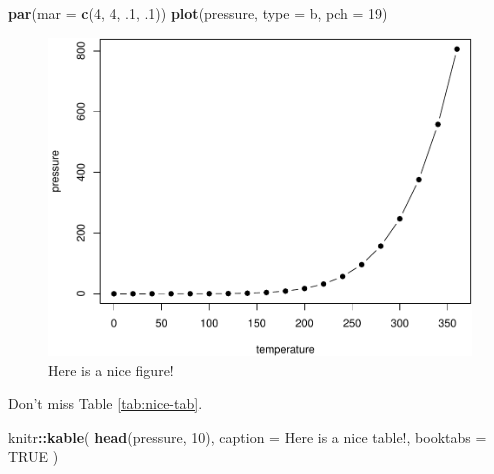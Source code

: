 \documentclass[
]{book}
\newenvironment{Shaded}{\begin{snugshade}}{\end{snugshade}}
\newcommand{\AttributeTok}[1]{\textcolor[rgb]{0.13,0.29,0.53}{#1}}
\newcommand{\ConstantTok}[1]{\textcolor[rgb]{0.56,0.35,0.01}{#1}}
\newcommand{\DecValTok}[1]{\textcolor[rgb]{0.00,0.00,0.81}{#1}}
\newcommand{\FunctionTok}[1]{\textcolor[rgb]{0.13,0.29,0.53}{\textbf{#1}}}
\newcommand{\NormalTok}[1]{#1}
\newcommand{\SpecialCharTok}[1]{\textcolor[rgb]{0.81,0.36,0.00}{\textbf{#1}}}
\newcommand{\StringTok}[1]{\textcolor[rgb]{0.31,0.60,0.02}{#1}}
\theoremstyle{definition}
\theoremstyle{definition}
\theoremstyle{definition}
\theoremstyle{definition}
\theoremstyle{remark}
\begin{document}
\begin{Shaded}
\begin{Highlighting}[]
\FunctionTok{par}\NormalTok{(}\AttributeTok{mar =} \FunctionTok{c}\NormalTok{(}\DecValTok{4}\NormalTok{, }\DecValTok{4}\NormalTok{, .}\DecValTok{1}\NormalTok{, .}\DecValTok{1}\NormalTok{))}
\FunctionTok{plot}\NormalTok{(pressure, }\AttributeTok{type =} \StringTok{\textquotesingle{}b\textquotesingle{}}\NormalTok{, }\AttributeTok{pch =} \DecValTok{19}\NormalTok{)}
\end{Highlighting}
\end{Shaded}

\begin{figure}

{\centering \includegraphics[width=0.8\linewidth]{202401280000-minimal-book-example_files/figure-latex/nice-fig-1} 

}

\caption{Here is a nice figure!}\label{fig:nice-fig}
\end{figure}

Don't miss Table \ref{tab:nice-tab}.

\begin{Shaded}
\begin{Highlighting}[]
\NormalTok{knitr}\SpecialCharTok{::}\FunctionTok{kable}\NormalTok{(}
  \FunctionTok{head}\NormalTok{(pressure, }\DecValTok{10}\NormalTok{), }\AttributeTok{caption =} \StringTok{\textquotesingle{}Here is a nice table!\textquotesingle{}}\NormalTok{,}
  \AttributeTok{booktabs =} \ConstantTok{TRUE}
\NormalTok{)}
\end{Highlighting}
\end{Shaded}
\end{document}
